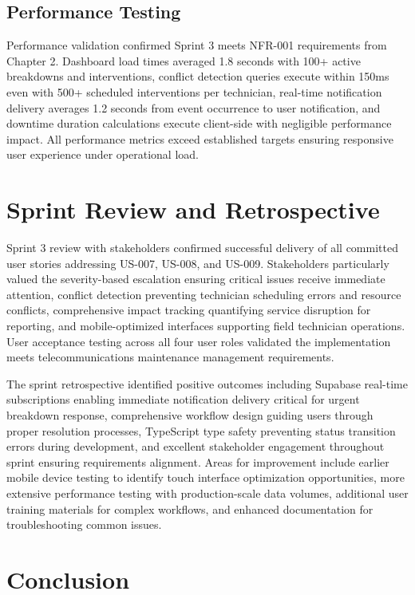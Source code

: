 \subsection{Performance Testing}

Performance validation confirmed Sprint 3 meets NFR-001 requirements from Chapter 2. Dashboard load times averaged 1.8 seconds with 100+ active breakdowns and interventions, conflict detection queries execute within 150ms even with 500+ scheduled interventions per technician, real-time notification delivery averages 1.2 seconds from event occurrence to user notification, and downtime duration calculations execute client-side with negligible performance impact. All performance metrics exceed established targets ensuring responsive user experience under operational load.

\section{Sprint Review and Retrospective}

Sprint 3 review with stakeholders confirmed successful delivery of all committed user stories addressing US-007, US-008, and US-009. Stakeholders particularly valued the severity-based escalation ensuring critical issues receive immediate attention, conflict detection preventing technician scheduling errors and resource conflicts, comprehensive impact tracking quantifying service disruption for reporting, and mobile-optimized interfaces supporting field technician operations. User acceptance testing across all four user roles validated the implementation meets telecommunications maintenance management requirements.

The sprint retrospective identified positive outcomes including Supabase real-time subscriptions enabling immediate notification delivery critical for urgent breakdown response, comprehensive workflow design guiding users through proper resolution processes, TypeScript type safety preventing status transition errors during development, and excellent stakeholder engagement throughout sprint ensuring requirements alignment. Areas for improvement include earlier mobile device testing to identify touch interface optimization opportunities, more extensive performance testing with production-scale data volumes, additional user training materials for complex workflows, and enhanced documentation for troubleshooting common issues.

\section{Conclusion}


